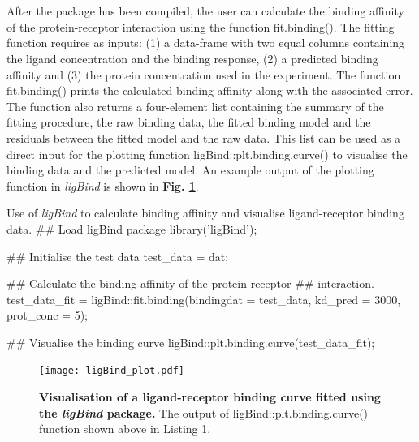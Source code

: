 %
%
\\\\
%
%
After the package has been compiled, the user can calculate the binding affinity of the protein-receptor interaction using the function fit.binding(). The fitting function requires as inputs: (1) a data-frame with two equal columns containing the ligand concentration and the binding response, (2) a predicted binding affinity and (3) the protein concentration used in the experiment. The function fit.binding() prints the calculated binding affinity along with the associated error. The function also returns a four-element list containing the summary of the fitting procedure, the raw binding data, the fitted binding model and the residuals between the fitted model and the raw data. This list can be used as a direct input for the plotting function ligBind::plt.binding.curve() to visualise the binding data and the predicted model. An example output of the plotting function in \textit{ligBind} is shown in \textbf{Fig. \ref{fig:ligBindplot}}.
%
%
\begin{sexylisting}[colback=white]{Use of \textit{ligBind} to calculate binding affinity and visualise ligand-receptor binding data.}
## Load ligBind package
library('ligBind');

## Initialise the test data
test_data = dat;

## Calculate the binding affinity of the protein-receptor
## interaction. 
test_data_fit = ligBind::fit.binding(bindingdat = test_data,
		kd_pred = 3000,
		prot_conc = 5);

## Visualise the binding curve
ligBind::plt.binding.curve(test_data_fit);
\end{sexylisting}
%
%
%
%
%
%
%
\begin{figure}[!ht]
\centering
\texttt{[image: ligBind\_plot.pdf]}
\caption[Visualisation of a ligand-receptor binding curve fitted using the \textit{ligBind} package.]{\textbf{Visualisation of a ligand-receptor binding curve fitted using the \textit{ligBind} package.} The output of ligBind::plt.binding.curve() function shown above in Listing 1.}
\label{fig:ligBindplot}
\end{figure}
\clearpage


